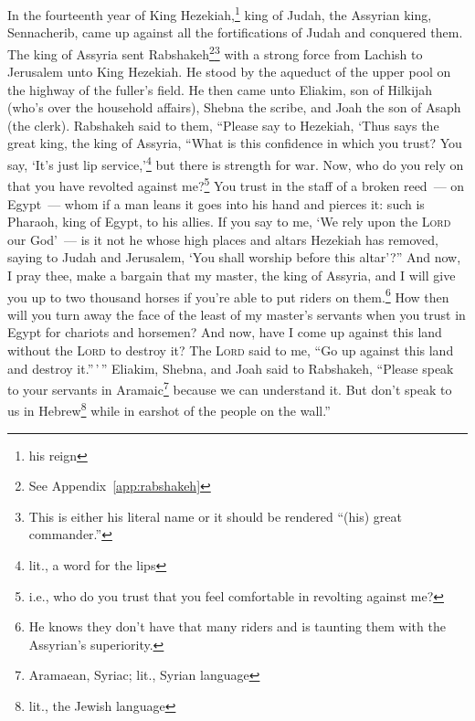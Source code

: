 
\begin{enumerate*}[mode=unboxed]
     In the fourteenth year of King Hezekiah,\footnote{his reign} king of Judah, the Assyrian king, Sennacherib, came up against all the fortifications of Judah and conquered them.%
     The king of Assyria sent Rabshakeh\footnote{See Appendix~\ref{app:rabshakeh}}\footnote{This is either his literal name or it should be rendered ``(his) great commander.''} with a strong force from Lachish to Jerusalem unto King Hezekiah. He stood by the aqueduct of the upper pool on the highway of the fuller's field.%
     He then came unto Eliakim, son of Hilkijah (who's over the household affairs), Shebna the scribe, and Joah the son of Asaph (the clerk).%
     Rabshakeh said to them, ``Please say to Hezekiah, `Thus says the great king, the king of Assyria, ``What is this confidence in which you trust?%
     You say, `It's just lip service,'\footnote{lit., a word for the lips} but there is strength for war. Now, who do you rely on that you have revolted against me?\footnote{i.e., who do you trust that you feel comfortable in revolting against me?}%
     You trust in the staff of a broken reed~--- on Egypt~--- whom if a man leans it goes into his hand and pierces it: such is Pharaoh, king of Egypt, to his allies.%
     If you say to me, `We rely upon the \textsc{Lord} our God'~--- is it not he whose high places and altars Hezekiah has removed, saying to Judah and Jerusalem, `You shall worship before this altar'?''%
     And now, I pray thee, make a bargain that my master, the king of Assyria, and I will give you up to two thousand horses if you're able to put riders on them.\footnote{He knows they don't have that many riders and is taunting them with the Assyrian's superiority.}%
     How then will you turn away the face of the least of my master's servants when you trust in Egypt for chariots and horsemen?%
     And now, have I come up against this land without the \textsc{Lord} to destroy it? The \textsc{Lord} said to me, ``Go up against this land and destroy it.''\,'\,''%
     Eliakim, Shebna, and Joah said to Rabshakeh, ``Please speak to your servants in Aramaic\footnote{Aramaean, Syriac; lit., Syrian language} because we can understand it. But don't speak to us in Hebrew\footnote{lit., the Jewish language} while in earshot of the people on the wall.''%

\end{enumerate*}
